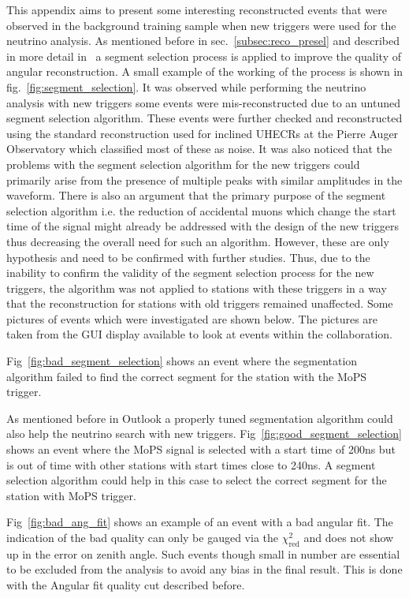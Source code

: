 This appendix aims to present some interesting reconstructed events that were observed in the background training sample when new triggers were used for the neutrino analysis. As mentioned before in sec.~\ref{subsec:reco_presel} and described in more detail in~\cite{gap_top_down_module} a segment selection process is applied to improve the quality of angular reconstruction. A small example of the working of the process is shown in fig.~\ref{fig:segment_selection}. It was observed while performing the neutrino analysis with new triggers some events were mis-reconstructed due to an untuned segment selection algorithm. These events were further checked and reconstructed using the standard reconstruction used for inclined UHECRs at the Pierre Auger Observatory which classified most of these as noise. It was also noticed that the problems with the segment selection algorithm for the new triggers could primarily arise from the presence of multiple peaks with similar amplitudes in the waveform. There is also an argument that the primary purpose of the segment selection algorithm i.e. the reduction of accidental muons which change the start time of the signal might already be addressed with the design of the new triggers thus decreasing the overall need for such an algorithm. However, these are only hypothesis and need to be confirmed with further studies. Thus, due to the inability to confirm the validity of the segment selection process for the new triggers, the algorithm was not applied to stations with these triggers in a way that the reconstruction for stations with old triggers remained unaffected. Some pictures of events which were investigated are shown below. The pictures are taken from the GUI display available to look at events within the collaboration.

Fig~\ref{fig:bad_segment_selection} shows an event where the segmentation algorithm failed to find the correct segment for the station with the MoPS trigger. 

As mentioned before in Outlook a properly tuned segmentation algorithm could also help the neutrino search with new triggers. Fig~\ref{fig:good_segment_selection} shows an event where the MoPS signal is selected with a start time of 200ns but is out of time with other stations with start times close to 240ns. A segment selection algorithm could help in this case to select the correct segment for the station with MoPS trigger.

Fig~\ref{fig:bad_ang_fit} shows an example of an event with a bad angular fit. The indication of the bad quality can only be gauged via the $\chi^2_{\text{red}}$ and does not show up in the error on zenith angle. Such events though small in number are essential to be excluded from the analysis to avoid any bias in the final result. This is done with the Angular fit quality cut described before. 

